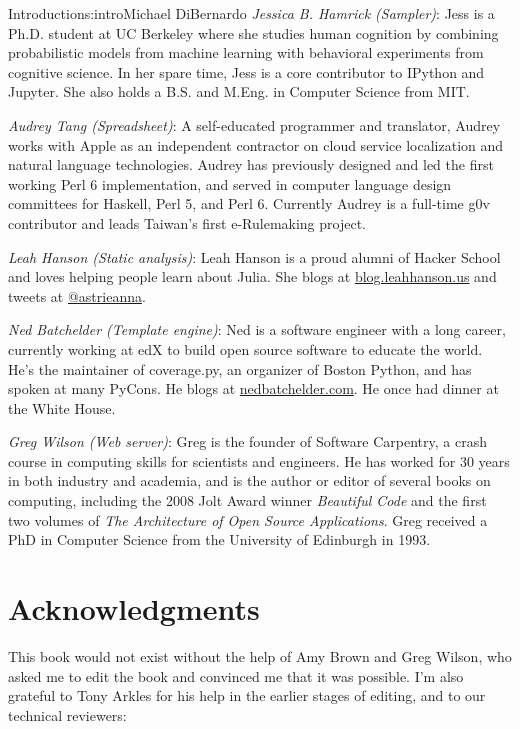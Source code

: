\begin{aosachapter}{Introduction}{s:intro}{Michael DiBernardo}
\emph{Jessica B. Hamrick (Sampler)}: Jess is a Ph.D. student at UC Berkeley where she studies human cognition by combining probabilistic models from machine learning with behavioral experiments from cognitive science. In her spare time, Jess is a core contributor to IPython and Jupyter. She also holds a B.S. and M.Eng. in Computer Science from MIT.

\emph{Audrey Tang (Spreadsheet)}: A self-educated programmer and translator, Audrey works with Apple as an independent contractor on cloud service localization and natural language technologies. Audrey has previously designed and led the first working Perl 6 implementation, and served in computer language design committees for Haskell, Perl 5, and Perl 6. Currently Audrey is a full-time g0v contributor and leads Taiwan’s first e-Rulemaking project.

\emph{Leah Hanson (Static analysis)}: Leah Hanson is a proud alumni of Hacker School and loves helping people learn about Julia. She blogs at \url{blog.leahhanson.us} and tweets at \url{@astrieanna}.

\emph{Ned Batchelder (Template engine)}: Ned is a software engineer with a long career, currently working at edX to build open source software to educate the world.  He's the maintainer of coverage.py, an organizer of Boston Python, and has spoken at many PyCons.  He blogs at \url{nedbatchelder.com}. He once had dinner at the White House.

\emph{Greg Wilson (Web server)}: Greg is the founder of Software Carpentry, a crash course in computing skills for scientists and engineers.  He has worked for 30 years in both industry and academia, and is the author or editor of several books on computing, including the 2008 Jolt Award winner \emph{Beautiful Code} and the first two volumes of \emph{The Architecture of Open Source Applications}. Greg received a PhD in Computer Science from the University of Edinburgh in 1993.

\section*{Acknowledgments}

This book would not exist without the help of Amy Brown and Greg Wilson,
who asked me to edit the book and convinced me that it was possible.
I'm also grateful to Tony Arkles for his help in the earlier stages of editing,
and to our technical reviewers:
 

\end{aosachapter}

